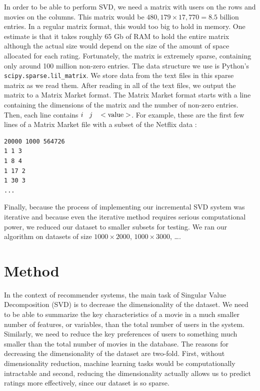 \documentclass{article} %
\begin{document}
In order to be able to perform SVD, we need a matrix with users on the rows and movies on the columns.
This matrix would be $480,179 \times 17,770 = 8.5 \textrm{ billion}$ entries.
In a regular matrix format, this would too big to hold in memory. One estimate is that it takes roughly 65 Gb of RAM to hold the entire matrix \citep{revoR} although the actual size would depend on the size of the amount of space allocated for each rating.
Fortunately, the matrix is extremely sparse, containing only around 100 million non-zero entries.
The data structure we use is Python's \verb!scipy.sparse.lil_matrix!.
We store data from the text files in this sparse matrix as we read them.
After reading in all of the text files, we output the matrix to a Matrix Market format.
The Matrix Market format starts with a line containing the dimensions of the matrix and the number of non-zero entries.
Then, each line contains $i \hspace{2ex} j \hspace{2ex} <\textrm{value}>$.
For example, these are the first few lines of a Matrix Market file with a subset of the Netflix data :

\begin{verbatim}
20000 1000 564726
1 1 3
1 8 4
1 17 2
1 30 3
...
\end{verbatim}

Finally, because the process of implementing our incremental SVD system was iterative and because even the iterative method requires serious computational power, we reduced our dataset to smaller subsets for testing.
We ran our algorithm on datasets of size $1000 \times 2000$, $1000 \times 3000$, \ldots.

\section{Method}

In the context of recommender systems, the main task of Singular Value Decomposition (SVD) is to decrease the dimensionality of the dataset.
We need to be able to summarize the key characteristics of a movie in a much smaller number of features, or variables, than the total number of users in the system.
Similarly, we need to reduce the key preferences of users to something much smaller than the total number of movies in the database.
The reasons for decreasing the dimensionality of the dataset are two-fold.
First, without dimensionality reduction, machine learning tasks would be computationally intractable and second, reducing the dimensionality actually allows us to predict ratings more effectively, since our dataset is so sparse.
\end{document}
